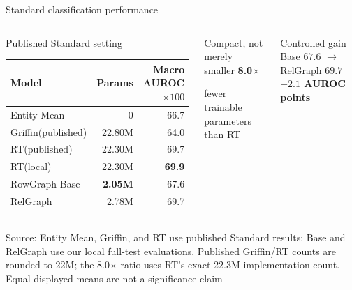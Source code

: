 \documentclass[aspectratio=169,10pt,t]{beamer}
\newcommand{\source}[1]{\vfill\par{\fontsize{6.3}{7.2}\selectfont\color{Muted}Source: #1}}
\newcommand{\good}[1]{{\bfseries\color{Green}#1}}
\begin{document}
\begin{frame}{Standard classification performance}
  \begin{columns}[T,onlytextwidth]
      \vspace{0pt}
      \begin{block}{Published Standard setting}
        \renewcommand{\arraystretch}{1.25}
        \begin{tabularx}{\linewidth}{Xrr}
          \toprule
          Model & Params & Macro AUROC $\times100$ \\
          \midrule
          Entity Mean & 0 & 66.7 \\
          Griffin(published) & 22.80M & 64.0 \\
          RT(published) & 22.30M & 69.7 \\
          RT(local) & 22.30M & \good{69.9} \\
          RowGraph-Base & \good{2.05M} & 67.6 \\
          \rowcolor{PaleOrange}RelGraph & 2.78M & 69.7 \\
          \bottomrule
        \end{tabularx}
      \end{block}

      \vspace{0pt}
      \begin{alertblock}{Compact, not merely smaller}
        \centering
        {\fontsize{20}{22}\selectfont\bfseries\color{Orange}8.0$\times$}\par
        fewer trainable parameters than RT
      \end{alertblock}
      \vspace{.2cm}
      \begin{block}{Controlled gain}
        \centering
        Base $67.6$ $\rightarrow$ RelGraph $69.7$\\
        \good{$+2.1$ AUROC points}
      \end{block}
  \end{columns}
  \source{Entity Mean, Griffin, and RT use published Standard results; Base and RelGraph use our local full-test evaluations. Published Griffin/RT counts are rounded to 22M; the 8.0$\times$ ratio uses RT's exact 22.3M implementation count. Equal displayed means are not a significance claim}
\end{frame}
\end{document}
